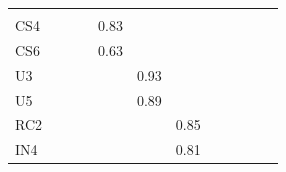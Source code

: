\documentclass{sig-alternate-05-2015}
\begin{document}
\begin{table}[]
{\begin{tabular}{l|lllllllllll}
\rowcolor[HTML]{FE996B} 
\multicolumn{1}{|l|}{\cellcolor[HTML]{FE996B}A3}  &                        &                        &                        &                        &                        &                        &                        &                        &                        &                         &                         \\ \cline{1-1}
\multicolumn{1}{|l|}{CS4}                         &                        &                        &                        & 0.83                   &                        &                        &                        &                        &                        &                         &                         \\ \cline{1-1}
\multicolumn{1}{|l|}{CS6}                         &                        &                        &                        & 0.63                   &                        &                        &                        &                        &                        &                         &                         \\ \cline{1-1}
\multicolumn{1}{|l|}{U3}                          &                        &                        &                        &                        & 0.93                   &                        &                        &                        &                        &                         &                         \\ \cline{1-1}
\multicolumn{1}{|l|}{U5}                          &                        &                        &                        &                        & 0.89                   &                        &                        &                        &                        &                         &                         \\ \cline{1-1}
\multicolumn{1}{|l|}{RC2}                         &                        &                        &                        &                        &                        & 0.85                   &                        &                        &                        &                         &                         \\ \cline{1-1}
\multicolumn{1}{|l|}{IN4}                         &                        &                        &                        &                        &                        & 0.81                   &                        &                        &                        &                         &                         \\ \cline{1-1}

\end{tabular}}
\end{table}
\end{document}
